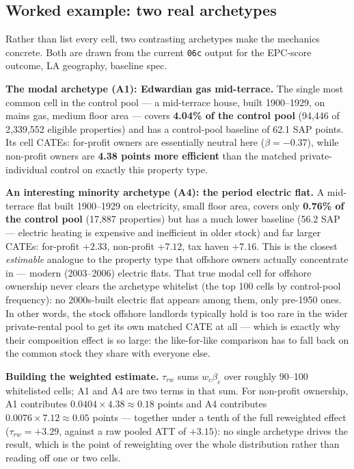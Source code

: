 \documentclass[11pt]{article}
\begin{document}
\subsection{Worked example: two real archetypes}
Rather than list every cell, two contrasting archetypes make the mechanics concrete.
Both are drawn from the current \texttt{06c} output for the EPC-score outcome,
LA geography, baseline spec.

\vspace{2pt}
\noindent\textbf{The modal archetype (A1): Edwardian gas mid-terrace.}
The single most common cell in the control pool --- a mid-terrace house, built
1900--1929, on mains gas, medium floor area --- covers \textbf{4.04\% of the control
pool} (94,446 of 2,339,552 eligible properties) and has a control-pool baseline of
62.1 SAP points. Its cell CATEs: for-profit owners are essentially neutral here
($\beta = -0.37$), while non-profit owners are \textbf{4.38 points more efficient}
than the matched private-individual control on exactly this property type.

\vspace{2pt}
\noindent\textbf{An interesting minority archetype (A4): the period electric flat.}
A mid-terrace flat built 1900--1929 on electricity, small floor area, covers only
\textbf{0.76\% of the control pool} (17,887 properties) but has a much lower
baseline (56.2 SAP --- electric heating is expensive and inefficient in older stock)
and far larger CATEs: for-profit $+2.33$, non-profit $+7.12$, tax haven $+7.16$. This
is the closest \emph{estimable} analogue to the property type that offshore owners
actually concentrate in --- modern (2003--2006) electric flats. That true modal cell
for offshore ownership never clears the archetype whitelist (the top 100 cells by
control-pool frequency): no 2000s-built electric flat appears among them, only
pre-1950 ones. In other words, the stock offshore landlords typically hold is too
rare in the wider private-rental pool to get its own matched CATE at all --- which is
exactly why their composition effect is so large: the like-for-like comparison has
to fall back on the common stock they share with everyone else.

\vspace{2pt}
\noindent\textbf{Building the weighted estimate.}
$\tau_{rw}$ sums $w_c\beta_c$ over roughly 90--100 whitelisted cells; A1 and A4 are
two terms in that sum. For non-profit ownership, A1 contributes
$0.0404 \times 4.38 \approx 0.18$ points and A4 contributes
$0.0076 \times 7.12 \approx 0.05$ points --- together under a tenth of the full
reweighted effect ($\tau_{rw} = +3.29$, against a raw pooled ATT of $+3.15$): no
single archetype drives the result, which is the point of reweighting over the whole
distribution rather than reading off one or two cells.
\end{document}

